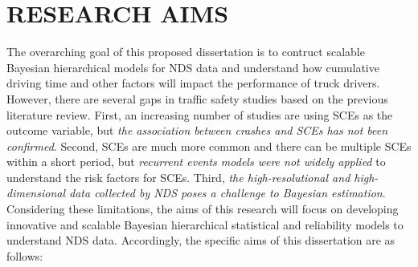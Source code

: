 \documentclass[12pt]{book}
\numberwithin{equation}{chapter}
\begin{document}
\hypertarget{research-aims}{%
\chapter{RESEARCH AIMS}\label{research-aims}}

The overarching goal of this proposed dissertation is to contruct scalable Bayesian hierarchical models for NDS data and understand how cumulative driving time and other factors will impact the performance of truck drivers. However, there are several gaps in traffic safety studies based on the previous literature review. First, an increasing number of studies are using SCEs as the outcome variable, but \emph{the association between crashes and SCEs has not been confirmed}. Second, SCEs are much more common and there can be multiple SCEs within a short period, but \emph{recurrent events models were not widely applied} to understand the risk factors for SCEs. Third, \emph{the high-resolutional and high-dimensional data collected by NDS poses a challenge to Bayesian estimation}. Considering these limitations, the aims of this research will focus on developing innovative and scalable Bayesian hierarchical statistical and reliability models to understand NDS data. Accordingly, the specific aims of this dissertation are as follows:
\end{document}
